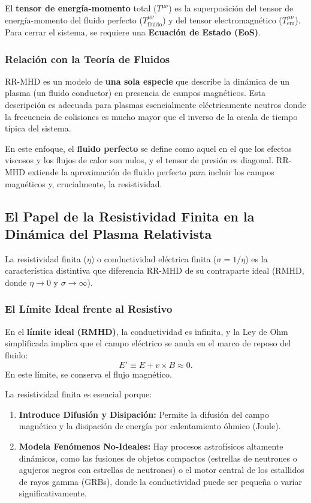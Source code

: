 El \textbf{tensor de energía-momento} total ($T^{\mu\nu}$) es la superposición del tensor de energía-momento del fluido perfecto ($T^{\mu\nu}_{\text{fluido}}$) y del tensor electromagnético ($T^{\mu\nu}_{\text{em}}$). Para cerrar el sistema, se requiere una \textbf{Ecuación de Estado (EoS)}.

\subsubsection{Relación con la Teoría de Fluidos}

RR-MHD es un modelo de \textbf{una sola especie} que describe la dinámica de un plasma (un fluido conductor) en presencia de campos magnéticos. Esta descripción es adecuada para plasmas esencialmente eléctricamente neutros donde la frecuencia de colisiones es mucho mayor que el inverso de la escala de tiempo típica del sistema.

En este enfoque, el \textbf{fluido perfecto} se define como aquel en el que los efectos viscosos y los flujos de calor son nulos, y el tensor de presión es diagonal. RR-MHD extiende la aproximación de fluido perfecto para incluir los campos magnéticos y, crucialmente, la resistividad.

\subsection{El Papel de la Resistividad Finita en la Dinámica del Plasma Relativista}

La resistividad finita ($\eta$) o conductividad eléctrica finita ($\sigma = 1/\eta$) es la característica distintiva que diferencia RR-MHD de su contraparte ideal (RMHD, donde $\eta \to 0$ y $\sigma \to \infty$).

\subsubsection{El Límite Ideal frente al Resistivo}

En el \textbf{límite ideal (RMHD)}, la conductividad es infinita, y la Ley de Ohm simplificada implica que el campo eléctrico se anula en el marco de reposo del fluido:
\begin{equation}
    E' \equiv E + v \times B \approx 0.
\end{equation}
En este límite, se conserva el flujo magnético.

La resistividad finita es esencial porque:

\begin{enumerate}
    \item \textbf{Introduce Difusión y Disipación:} Permite la difusión del campo magnético y la disipación de energía por calentamiento óhmico (Joule).
    \item \textbf{Modela Fenómenos No-Ideales:} Hay procesos astrofísicos altamente dinámicos, como las fusiones de objetos compactos (estrellas de neutrones o agujeros negros con estrellas de neutrones) o el motor central de los estallidos de rayos gamma (GRBs), donde la conductividad puede ser pequeña o variar significativamente.
\end{enumerate}

